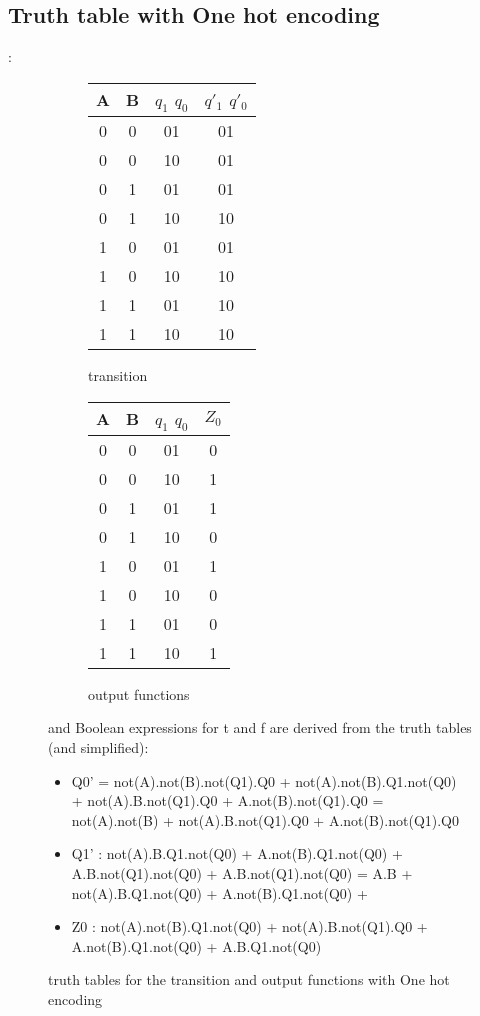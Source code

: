 \documentclass{article}
\begin{document}
\subsection{Truth table with One hot encoding} :


 \begin{figure}[h!]
\begin{subfigure}{0.5\textwidth}
\centering
\begin{tabular}{c c | c | c}
	
	A & B & $q_1$ $q_0$ & $q'_1$ $q'_0$ \\
\hline	
	0 & 0 & 01 & 01 \\
	0 & 0 & 10 & 01 \\
	0 & 1 & 01 & 01 \\
	0 & 1 & 10 & 10 \\
	1 & 0 & 01 & 01  \\
	1 & 0 & 10 & 10 \\
	1 & 1 & 01 & 10 \\
	1 & 1 & 10 & 10 \\	
 \end{tabular}

 \caption{transition}
\end{subfigure}
\hfill 
\begin{subfigure}{0.5\textwidth}
\centering
\begin{tabular}{c c  c | c}
	
	A & B & $q_1$ $q_0$ & $Z_0$ \\
\hline	
	0 & 0 & 01 & 0 \\
	0 & 0 & 10 & 1 \\
	0 & 1 & 01 & 1 \\
	0 & 1 & 10 & 0 \\
	1 & 0 & 01 & 1  \\
	1 & 0 & 10 & 0 \\
	1 & 1 & 01 & 0 \\
	1 & 1 & 10 & 1 \\	
 \end{tabular}
  \caption{output functions}
\end{subfigure}
 
 \caption{ truth tables for the transition and output functions with One hot encoding}
 
 and Boolean expressions for t and f are derived from the truth tables (and simplified):
 
 
 \begin{itemize}
 \item Q0' = 
 not(A).not(B).not(Q1).Q0 + 
 not(A).not(B).Q1.not(Q0) +
 not(A).B.not(Q1).Q0 + 
 A.not(B).not(Q1).Q0 = not(A).not(B) +   not(A).B.not(Q1).Q0 + 
 A.not(B).not(Q1).Q0
 \item Q1' : 
 not(A).B.Q1.not(Q0) + 
 A.not(B).Q1.not(Q0) +
A.B.not(Q1).not(Q0) + 
A.B.not(Q1).not(Q0) = A.B +  not(A).B.Q1.not(Q0) + 
 A.not(B).Q1.not(Q0) +
 \item Z0 : 
 not(A).not(B).Q1.not(Q0) + 
 not(A).B.not(Q1).Q0 +
 A.not(B).Q1.not(Q0) + 
A.B.Q1.not(Q0)
 \end{itemize}
 \end{figure}
\end{document}

